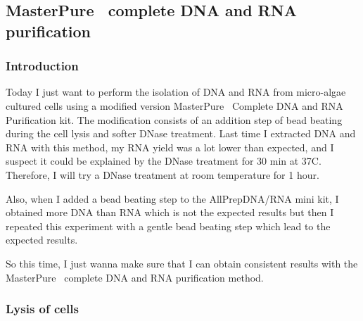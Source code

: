 \subsection{MasterPure\texttrademark~ complete DNA and RNA purification}
\label{task:20180311_cj0}


\subsubsection{Introduction}

Today I just want to perform the isolation of DNA and RNA from micro-algae cultured cells using a modified version MasterPure\texttrademark~ Complete DNA and RNA Purification kit. The modification consists of an addition step of bead beating during the cell lysis and softer DNase treatment. Last time I extracted DNA and RNA with this method, my RNA yield was a lot lower than expected, and I suspect it could be explained by the DNase treatment for 30 min at 37\degree C. Therefore, I will try a DNase treatment at room temperature for 1 hour. 

Also, when I added a bead beating step to the AllPrep\cR DNA/RNA mini kit, I obtained more DNA than RNA which is not the expected results but then I repeated this experiment with a gentle bead beating step which lead to the expected results. 

So this time, I just wanna make sure that I can obtain consistent results with the MasterPure\texttrademark~ complete DNA and RNA purification method.

\subsubsection{Lysis of cells}

